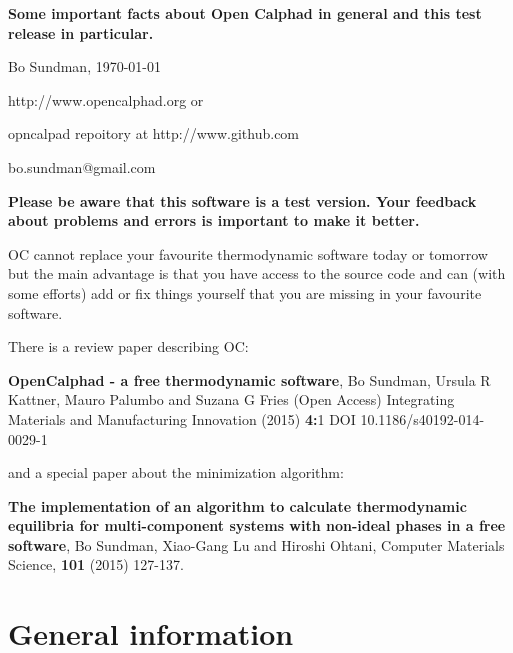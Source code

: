 \documentclass[12pt]{article}
\begin{document}
\begin{center}
{\Large \bf Some important facts about Open Calphad in general and
  this test release in particular.

}

Bo Sundman, \today

http://www.opencalphad.org or

opncalpad repoitory at http://www.github.com

bo.sundman@gmail.com
\end{center}

{\large \bf Please be aware that this software is a test version.
  Your feedback about problems and errors is important to make it
  better.

}

OC cannot replace your favourite thermodynamic software today or
tomorrow but the main advantage is that you have access to the source
code and can (with some efforts) add or fix things yourself that you
are missing in your favourite software.

There is a review paper describing OC:

{\bf OpenCalphad - a free thermodynamic software}, Bo Sundman, Ursula
R Kattner, Mauro Palumbo and Suzana G Fries (Open Access) Integrating
Materials and Manufacturing Innovation (2015) {\bf 4:}1 DOI
10.1186/s40192-014-0029-1

and a special paper about the minimization algorithm:

{\bf The implementation of an algorithm to calculate thermodynamic
  equilibria for multi-component systems with non-ideal phases in a
  free software}, Bo Sundman, Xiao-Gang Lu and Hiroshi Ohtani,
Computer Materials Science, {\bf 101} (2015) 127-137.

\section{General information}
\end{document}

